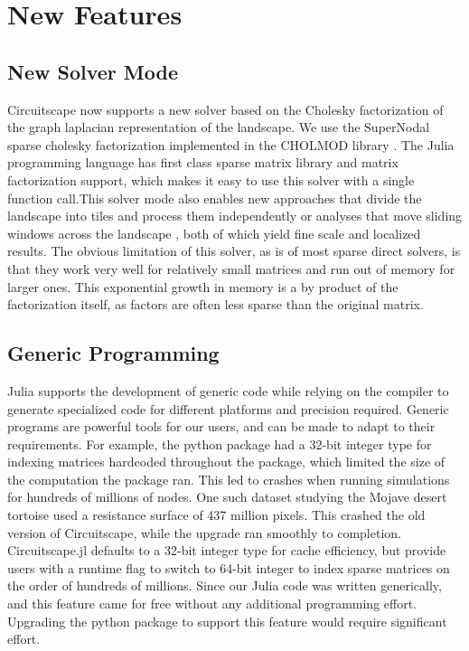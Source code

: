 \documentclass{juliacon}
\begin{document}
\section{New Features}

\subsection{New Solver Mode}

Circuitscape now supports a new solver based on the Cholesky factorization of the graph laplacian representation of the landscape. We use the SuperNodal sparse cholesky factorization implemented in the CHOLMOD library \cite{chen2008algorithm}. The Julia programming language has first class sparse matrix library and matrix factorization support, which makes it easy to use this solver with a single function call.This solver mode also enables new approaches that divide the landscape into tiles and process them independently \cite{pelletier2014applying}or analyses that move sliding windows across the landscape \cite{mcrae2016conserving}, both of which yield fine scale and localized results. The obvious limitation of this solver, as is of most sparse direct solvers, is that they work very well for relatively small matrices and run out of memory for larger ones. This exponential growth in memory is a by product of the factorization itself, as factors are often less sparse than the original matrix. 

\subsection{Generic Programming}

Julia supports the development of generic code while relying on the compiler to generate specialized code for different platforms and precision required. Generic programs are powerful tools for our users, and can be made to adapt to their requirements. For example, the python package had a 32-bit integer type for indexing matrices hardcoded throughout the package, which limited the size of the computation the package ran. This led to crashes when running simulations for hundreds of millions of nodes. One such dataset studying the Mojave desert tortoise \cite{gray2019} used a resistance surface of 437 million pixels. This crashed the old version of Circuitscape, while the upgrade ran smoothly to completion. Circuitscape.jl defaults to a 32-bit integer type for cache efficiency, but provide users with a runtime flag to switch to 64-bit integer to index sparse matrices on the order of hundreds of millions. Since our Julia code was written generically, and this feature came for free without any additional programming effort. Upgrading the python package to support this feature would require significant effort. 
\end{document}
